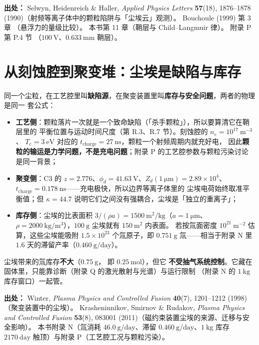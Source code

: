 {\footnotesize
\textbf{出处：} Selwyn, Heidenreich \& Haller, \emph{Applied Physics Letters} \textbf{57}(18),
1876--1878 (1990)（射频等离子体中的颗粒陷阱与「尘埃云」观测）。
Bouchoule (1999) 第 3 章
（悬浮力的量级比较）。
本书第 11 章（鞘层与 Child--Langmuir 律）。
附录 P 第 P.4 节
（$100\ \mathrm{V}$、$0.633\ \mathrm{mm}$ 鞘层）。
}

\section{从刻蚀腔到聚变堆：尘埃是缺陷与库存}
\label{sec:app-r-device}

同一个尘粒，在工艺腔里叫\textbf{缺陷源}，在聚变装置里叫\textbf{库存与安全问题}，两者的物理是同一
套公式：

\begin{itemize}
  \item \textbf{工艺侧}：颗粒落片一次就是一个致命缺陷（「杀手颗粒」），所以要算清它在鞘层里的
        平衡位置与运动时间尺度（第 R.3、R.7 节）。刻蚀腔的 $n_e=10^{17}\ \mathrm{m^{-3}}$、
        $T_e=3\ \mathrm{eV}$ 对应的 $t_{\mathrm{charge}}=27\ \mathrm{ns}$，颗粒一个射频周期内就充好电，
        因此\textbf{颗粒的输运是力学问题，不是充电问题}；附录 P 的工艺腔参数与颗粒污染讨论是同一背景；
  \item \textbf{聚变侧}：C3 的 $z=2.776$、$\phi_d=41.63\ \mathrm{V}$、$Z_d(1\ \mathrm{\mu m})
        =2.89\times10^{4}$、$t_{\mathrm{charge}}=0.178\ \mathrm{ns}$——充电极快，所以边界等离子体里的
        尘埃电荷始终取准平衡值；但 $\kappa=44.7$ 说明它们之间没有强耦合，尘埃是「独立的重离子」；
  \item \textbf{库存侧}：尘埃的比表面积 $3/(\rho a)=1500\ \mathrm{m^2/kg}$（$a=1\ \mathrm{\mu m}$、
        $\rho=2000\ \mathrm{kg/m^3}$），$100\ \mathrm{g}$ 尘埃就有 $150\ \mathrm{m^2}$ 内表面。
        若按氚面密度 $10^{21}\ \mathrm{m^{-2}}$ 估算，这些尘埃能吸附
        $1.5\times10^{23}$ 个氚原子，即 $0.751\ \mathrm{g}$ 氚——相当于附录 N 里
        $1.6$ 天的滞留产率（$0.460\ \mathrm{g/day}$）。
\end{itemize}

尘埃带来的氚库存\textbf{不大}（$0.75\ \mathrm{g}$，
即 $0.25\ \mathrm{mol}$），但它
\textbf{不受抽气系统控制}。它藏在固体里，只能靠诊断（附录 Q 的激光散射与光谱）与运行限制
（附录 N 的 $1\ \mathrm{kg}$ 库存窗口）一起管。

{\footnotesize
\textbf{出处：} Winter, \emph{Plasma Physics and Controlled Fusion} \textbf{40}(7), 1201--1212
(1998)（聚变装置中的尘埃）。
Krasheninnikov, Smirnov \& Rudakov, \emph{Plasma Physics and
Controlled Fusion} \textbf{53}(8), 083001 (2011)（磁约束装置尘埃的来源、迁移与安全影响）。
本书附录 N（氚消耗 $46.0\ \mathrm{g/day}$、滞留 $0.460\ \mathrm{g/day}$、$1\ \mathrm{kg}$ 库存
$2170\ \mathrm{day}$ 触顶）与附录 P（工艺腔工况与颗粒污染）。
}

